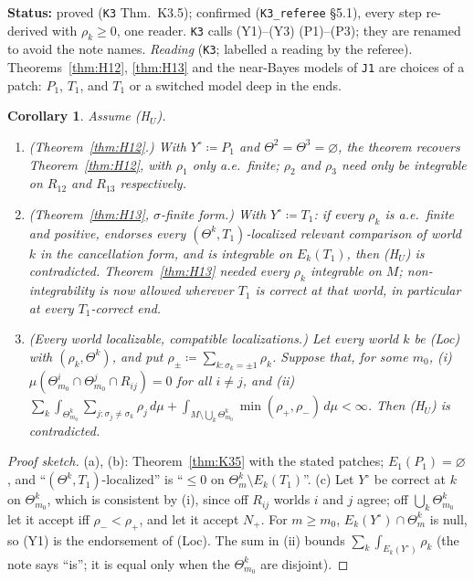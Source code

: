 \documentclass[11pt]{article}
\newtheorem{corollary}[theorem]{Corollary}
\theoremstyle{definition}
\theoremstyle{remark}
\newcommand{\src}[1]{\texttt{#1}}
\newcommand{\status}[1]{\par\smallskip\noindent\textbf{Status:} #1\par\smallskip}
\begin{document}
\status{proved (\src{K3} Thm.~K3.5); confirmed (\src{K3\_referee} \S5.1), every step re-derived with $\rho_k\ge0$, one reader. \src{K3} calls (Y1)--(Y3) (P1)--(P3); they are renamed to avoid the note names. \emph{Reading} (\src{K3}; labelled a reading by the referee). Theorems~\ref{thm:H12}, \ref{thm:H13} and the near-Bayes models of \src{J1} are choices of a patch: $P_1$, $T_1$, and $T_1$ or a switched model deep in the ends.}

\begin{corollary}\label{cor:K35p}
Assume (H$_U$).
\begin{enumerate}[leftmargin=*,label=(\alph*)]
\item (Theorem~\ref{thm:H12}.) With $Y^\circ\coloneqq P_1$ and $\Theta^2=\Theta^3=\varnothing$, the theorem recovers Theorem~\ref{thm:H12}, with $\rho_1$ only a.e.\ finite; $\rho_2$ and $\rho_3$ need only be integrable on $R_{12}$ and $R_{13}$ respectively.
\item (Theorem~\ref{thm:H13}, $\sigma$-finite form.) With $Y^\circ\coloneqq T_1$: if every $\rho_k$ is a.e.\ finite and positive, endorses every $(\Theta^k,T_1)$-localized relevant comparison of world $k$ in the cancellation form, and is integrable on $E_k(T_1)$, then (H$_U$) is contradicted. Theorem~\ref{thm:H13} needed every $\rho_k$ integrable on $M$; non-integrability is now allowed wherever $T_1$ is correct at that world, in particular at every $T_1$-correct end.
\item (Every world localizable, compatible localizations.) Let every world $k$ be (Loc) with $(\rho_k,\Theta^k)$, and put $\rho_\pm\coloneqq\sum_{k:\sigma_k=\pm1}\rho_k$. Suppose that, for some $m_0$, (i) $\mu(\Theta^i_{m_0}\cap\Theta^j_{m_0}\cap R_{ij})=0$ for all $i\ne j$, and (ii) $\sum_k\int_{\Theta^k_{m_0}}\sum_{j:\sigma_j\ne\sigma_k}\rho_j\,d\mu+\int_{M\setminus\bigcup_k\Theta^k_{m_0}}\min(\rho_+,\rho_-)\,d\mu<\infty$. Then (H$_U$) is contradicted.
\end{enumerate}
\end{corollary}
\begin{proof}[Proof sketch]
(a), (b): Theorem~\ref{thm:K35} with the stated patches; $E_1(P_1)=\varnothing$, and ``$(\Theta^k,T_1)$-localized'' is ``$\le0$ on $\Theta^k_m\setminus E_k(T_1)$''. (c) Let $Y^\circ$ be correct at $k$ on $\Theta^k_{m_0}$, which is consistent by (i), since off $R_{ij}$ worlds $i$ and $j$ agree; off $\bigcup_k\Theta^k_{m_0}$ let it accept iff $\rho_-<\rho_+$, and let it accept $N_+$. For $m\ge m_0$, $E_k(Y^\circ)\cap\Theta^k_m$ is null, so (Y1) is the endorsement of (Loc). The sum in (ii) bounds $\sum_k\int_{E_k(Y^\circ)}\rho_k$ (the note says ``is''; it is equal only when the $\Theta^k_{m_0}$ are disjoint).
\end{proof}
\end{document}
